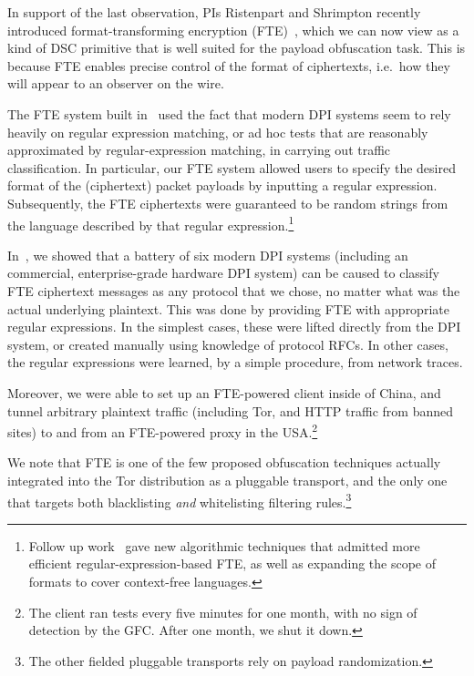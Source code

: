  In support of the last observation, PIs
Ristenpart and Shrimpton recently introduced format-transforming encryption
(FTE)~\cite{Dyer-2013}, which we can now view as a kind of DSC primitive that is
well suited for the payload obfuscation task.  This is because FTE enables
precise control of the format of ciphertexts, i.e.\ how they will appear to an
observer on the wire.  

The FTE system built in~\cite{Dyer-2013} used the fact that modern
DPI systems seem to rely heavily on regular expression matching, or ad hoc tests
that are reasonably approximated by regular-expression matching, in
carrying out traffic classification. In particular, our FTE system
allowed users to specify the desired format of the (ciphertext) packet
payloads by inputting a regular expression. Subsequently, the FTE
ciphertexts were guaranteed to be random
strings from the language described by that regular expression.\footnote{Follow up work~\cite{luchaup2014formatted} gave new algorithmic techniques that
admitted more efficient regular-expression-based FTE, as well as
expanding the scope of formats to cover context-free languages.} 
 

In~\cite{Dyer-2013}, we showed that a battery of six modern DPI systems
(including an commercial, enterprise-grade hardware DPI system) can be
caused to classify FTE ciphertext messages as any protocol that we
chose, no matter what was the actual underlying plaintext.  This was
done by providing FTE with appropriate regular expressions.  In the
simplest cases, these were lifted directly from the DPI system, or
created manually using knowledge of protocol RFCs.  In other cases,
the regular expressions were learned, by a simple procedure, from
network traces.

Moreover, we were able to set up an FTE-powered client inside of
China, and tunnel arbitrary plaintext traffic (including Tor, and HTTP
traffic from banned sites) to and from an FTE-powered proxy in the
USA.\footnote{The client ran tests every five minutes for one month,
  with no sign of detection by the GFC.  After
  one month, we shut it down.} 

We note that FTE is one of the few proposed obfuscation techniques
actually integrated into the Tor distribution as a pluggable
transport, and the only one that targets both blacklisting
\textit{and} whitelisting filtering rules.\footnote{The other fielded pluggable transports rely on payload randomization.}



